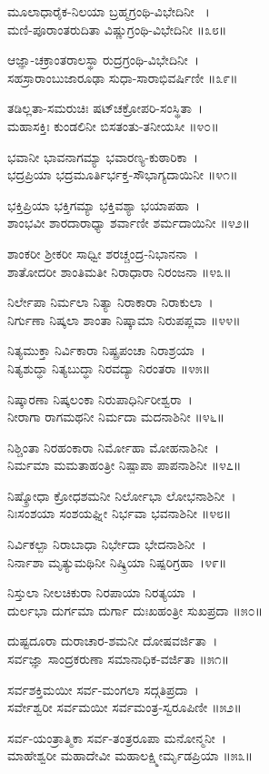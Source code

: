 ಮೂಲಾಧಾರೈಕ-ನಿಲಯಾ ಬ್ರಹ್ಮಗ್ರಂಥಿ-ವಿಭೇದಿನೀ ~।\\
ಮಣಿ-ಪೂರಾಂತರುದಿತಾ ವಿಷ್ಣುಗ್ರಂಥಿ-ವಿಭೇದಿನೀ ॥೩೮॥

ಆಜ್ಞಾ-ಚಕ್ರಾಂತರಾಲಸ್ಥಾ ರುದ್ರಗ್ರಂಥಿ-ವಿಭೇದಿನೀ~।\\
ಸಹಸ್ರಾರಾಂಬುಜಾರೂಢಾ ಸುಧಾ-ಸಾರಾಭಿವರ್ಷಿಣೀ ॥೩೯॥

ತಡಿಲ್ಲತಾ-ಸಮರುಚಿಃ ಷಟ್‍ಚಕ್ರೋಪರಿ-ಸಂಸ್ಥಿತಾ~।\\
ಮಹಾಸಕ್ತಿಃ ಕುಂಡಲಿನೀ ಬಿಸತಂತು-ತನೀಯಸೀ ॥೪೦॥

ಭವಾನೀ ಭಾವನಾಗಮ್ಯಾ ಭವಾರಣ್ಯ-ಕುಠಾರಿಕಾ~।\\
ಭದ್ರಪ್ರಿಯಾ ಭದ್ರಮೂರ್ತಿರ್ಭಕ್ತ-ಸೌಭಾಗ್ಯದಾಯಿನೀ ॥೪೧॥

ಭಕ್ತಿಪ್ರಿಯಾ ಭಕ್ತಿಗಮ್ಯಾ ಭಕ್ತಿವಶ್ಯಾ ಭಯಾಪಹಾ~।\\
ಶಾಂಭವೀ ಶಾರದಾರಾಧ್ಯಾ ಶರ್ವಾಣೀ ಶರ್ಮದಾಯಿನೀ ॥೪೨॥

ಶಾಂಕರೀ ಶ್ರೀಕರೀ ಸಾಧ್ವೀ ಶರಚ್ಚಂದ್ರ-ನಿಭಾನನಾ~।\\
ಶಾತೋದರೀ ಶಾಂತಿಮತೀ ನಿರಾಧಾರಾ ನಿರಂಜನಾ ॥೪೩॥

ನಿರ್ಲೇಪಾ ನಿರ್ಮಲಾ ನಿತ್ಯಾ ನಿರಾಕಾರಾ ನಿರಾಕುಲಾ~।\\
ನಿರ್ಗುಣಾ ನಿಷ್ಕಲಾ ಶಾಂತಾ ನಿಷ್ಕಾಮಾ ನಿರುಪಪ್ಲವಾ ॥೪೪॥

ನಿತ್ಯಮುಕ್ತಾ ನಿರ್ವಿಕಾರಾ ನಿಷ್ಪ್ರಪಂಚಾ ನಿರಾಶ್ರಯಾ~।\\
ನಿತ್ಯಶುದ್ಧಾ ನಿತ್ಯಬುದ್ಧಾ ನಿರವದ್ಯಾ ನಿರಂತರಾ ॥೪೫॥

ನಿಷ್ಕಾರಣಾ ನಿಷ್ಕಲಂಕಾ ನಿರುಪಾಧಿರ್ನಿರೀಶ್ವರಾ~।\\
ನೀರಾಗಾ ರಾಗಮಥನೀ ನಿರ್ಮದಾ ಮದನಾಶಿನೀ ॥೪೬॥

ನಿಶ್ಚಿಂತಾ ನಿರಹಂಕಾರಾ ನಿರ್ಮೋಹಾ ಮೋಹನಾಶಿನೀ~।\\
ನಿರ್ಮಮಾ ಮಮತಾಹಂತ್ರೀ ನಿಷ್ಪಾಪಾ ಪಾಪನಾಶಿನೀ ॥೪೭॥

ನಿಷ್ಕ್ರೋಧಾ ಕ್ರೋಧಶಮನೀ ನಿರ್ಲೋಭಾ ಲೋಭನಾಶಿನೀ~।\\
ನಿಃಸಂಶಯಾ ಸಂಶಯಘ್ನೀ ನಿರ್ಭವಾ ಭವನಾಶಿನೀ ॥೪೮॥

ನಿರ್ವಿಕಲ್ಪಾ ನಿರಾಬಾಧಾ ನಿರ್ಭೇದಾ ಭೇದನಾಶಿನೀ~।\\
ನಿರ್ನಾಶಾ ಮೃತ್ಯುಮಥಿನೀ ನಿಷ್ಕ್ರಿಯಾ ನಿಷ್ಪರಿಗ್ರಹಾ~।೪೯॥

ನಿಸ್ತುಲಾ ನೀಲಚಿಕುರಾ ನಿರಪಾಯಾ ನಿರತ್ಯಯಾ~।\\
ದುರ್ಲಭಾ ದುರ್ಗಮಾ ದುರ್ಗಾ ದುಃಖಹಂತ್ರೀ ಸುಖಪ್ರದಾ ॥೫೦॥

ದುಷ್ಟದೂರಾ ದುರಾಚಾರ-ಶಮನೀ ದೋಷವರ್ಜಿತಾ~।\\
ಸರ್ವಜ್ಞಾ ಸಾಂದ್ರಕರುಣಾ ಸಮಾನಾಧಿಕ-ವರ್ಜಿತಾ ॥೫೧॥

ಸರ್ವಶಕ್ತಿಮಯೀ ಸರ್ವ-ಮಂಗಲಾ  ಸದ್ಗತಿಪ್ರದಾ~।\\
ಸರ್ವೇಶ್ವರೀ ಸರ್ವಮಯೀ ಸರ್ವಮಂತ್ರ-ಸ್ವರೂಪಿಣೀ ॥೫೨॥

ಸರ್ವ-ಯಂತ್ರಾತ್ಮಿಕಾ ಸರ್ವ-ತಂತ್ರರೂಪಾ ಮನೋನ್ಮನೀ~।\\
ಮಾಹೇಶ್ವರೀ ಮಹಾದೇವೀ ಮಹಾಲಕ್ಷ್ಮೀರ್ಮೃಡಪ್ರಿಯಾ ॥೫೩॥

